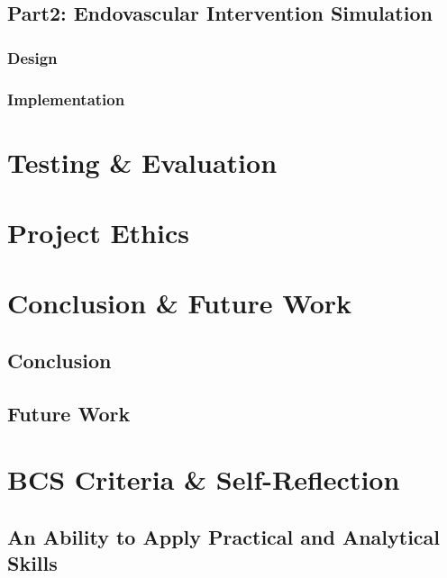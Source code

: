 \documentclass[12pt]{article}
\begin{document}
\subsection{Part2: Endovascular Intervention Simulation}

\subsubsection{Design}

\subsubsection{Implementation}


\section{Testing \& Evaluation}

\section{Project Ethics}

\section{Conclusion \& Future Work}
\subsection{Conclusion}

\subsection{Future Work}

\section{BCS Criteria \& Self-Reflection}

\subsection{An Ability to Apply Practical and Analytical Skills}
\end{document}
